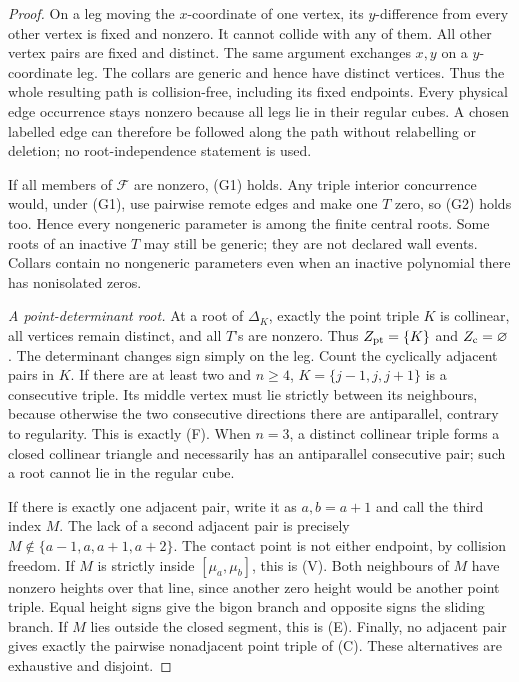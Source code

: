 \begin{proof}
On a leg moving the $x$-coordinate of one vertex, its $y$-difference from
every other vertex is fixed and nonzero. It cannot collide with any of them.
All other vertex pairs are fixed and distinct. The same argument exchanges
$x,y$ on a $y$-coordinate leg. The collars are generic and hence have distinct
vertices. Thus the whole resulting path is collision-free, including its
fixed endpoints. Every physical edge occurrence stays nonzero because all
legs lie in their regular cubes. A chosen labelled edge can therefore be
followed along the path without relabelling or deletion; no root-independence
statement is used.

If all members of $\mathcal F$ are nonzero, (G1) holds. Any triple interior
concurrence would, under (G1), use pairwise remote edges and make one $T$
zero, so (G2) holds too. Hence every nongeneric parameter is among the finite
central roots. Some roots of an inactive $T$ may still be generic; they are
not declared wall events. Collars contain no nongeneric parameters even when
an inactive polynomial there has nonisolated zeros.

\emph{A point-determinant root.}
At a root of $\Delta_K$, exactly the point triple $K$ is collinear, all
vertices remain distinct, and all $T$'s are nonzero. Thus $Z_{\rm pt}=\{K\}$
and $Z_{\rm c}=\varnothing$. The determinant changes sign simply on the leg.
Count the cyclically adjacent pairs in $K$. If there are at least two and
$n\geq4$, $K=\{j-1,j,j+1\}$ is a consecutive triple. Its middle vertex
must lie strictly between its neighbours, because otherwise the two consecutive
directions there are antiparallel, contrary to regularity. This is exactly (F).
When $n=3$, a distinct collinear triple forms a closed collinear triangle and
necessarily has an antiparallel consecutive pair; such a root cannot lie in
the regular cube.

If there is exactly one adjacent pair, write it as $a,b=a+1$ and call the
third index $M$. The lack of a second adjacent pair is precisely
$M\notin\{a-1,a,a+1,a+2\}$. The contact point is not either endpoint, by
collision freedom. If $M$ is strictly inside $[\mu_a,\mu_b]$, this is (V).
Both neighbours of $M$ have nonzero heights over that line, since another
zero height would be another point triple. Equal height signs give the bigon
branch and opposite signs the sliding branch. If $M$ lies outside the closed
segment, this is (E). Finally, no adjacent pair gives exactly the pairwise
nonadjacent point triple of (C). These alternatives are exhaustive and disjoint.


\end{proof}
